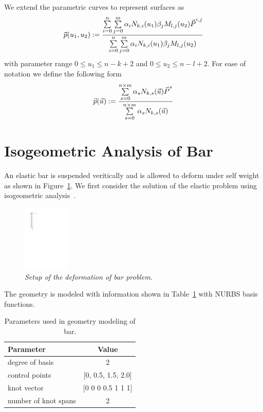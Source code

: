 \documentclass[submit,12pt]{aiaa-pretty} %
\begin{document}
We extend the parametric curves to represent surfaces as
\begin{equation}
  \vec{\mkern0mup}(u_1, u_2) := \dfrac{ {\sum\limits_{i=0}^{n} \sum\limits_{j=0}^{m} \alpha_i N_{k,i}(u_1) \beta_j M_{l,j}(u_2) \vec{\mkern0muP}^{i,j}}} {\sum\limits_{i=0}^{n} \sum\limits_{j=0}^{m} \alpha_i N_{k,i}(u_1) \beta_j M_{l,j}(u_2)}
\end{equation}
with parameter range $0 \le u_1 \le n - k + 2$ and $0 \le u_2 \le n - l + 2$. 
For ease of notation we define the following form
\begin{equation}
  \vec{\mkern0mup}(\vec{\mkern0muu}) := \dfrac{ {\sum \limits_{s=0}^{n \times m} \alpha_{s} N_{k,s}(\vec{\mkern0muu}) \vec{\mkern0muP}^{s}}} {\sum \limits_{s=0}^{n \times m} \alpha_{s} N_{k,s}(\vec{\mkern0muu})}
\end{equation}

\section{Isogeometric Analysis of Bar}
An elastic bar is suspended veritically and is allowed to deform under
self weight as shown in Figure~\ref{fig:bar-setup}. We first consider
the solution of the elastic problem using isogeometric
analysis~\cite{bar-analysis,1D_bar}.
\begin{figure}[h] 
  \centering
  \includegraphics[width=0.2\textwidth]{bar-setup.pdf} 
  \caption{\emph{Setup of the deformation of bar problem.}}
  \label{fig:bar-setup}
\end{figure}
The geometry is modeled with information shown in
Table~\ref{tab:bar-problem-parameters} with NURBS basis functions.
\begin{table}
  \centering
  \caption{Parameters used in geometry modeling of bar.}
  \label{tab:bar-problem-parameters}
  \begin{tabular}{lc}
    \hline
    Parameter & Value \\
    \hline
    degree of basis & 2 \\
    control points  &  [0, 0.5, 1.5, 2.0] \\
    knot vector     & [0 0 0 0.5 1 1 1] \\
    number of knot spans & 2 \\
    \hline
  \end{tabular}
\end{table}
\end{document}
